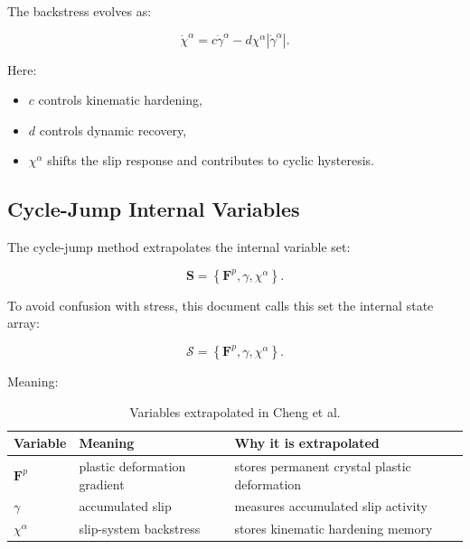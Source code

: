 \documentclass[11pt,a4paper]{article}
\begin{document}
The backstress evolves as:

\begin{equation}
\dot{\chi}^{\alpha}
=
 c\dot{\gamma}^{\alpha}
-
 d\chi^{\alpha}
|\dot{\gamma}^{\alpha}| .
\end{equation}

Here:

\begin{itemize}
    \item $c$ controls kinematic hardening,
    \item $d$ controls dynamic recovery,
    \item $\chi^{\alpha}$ shifts the slip response and contributes to cyclic hysteresis.
\end{itemize}

\subsection{Cycle-Jump Internal Variables}

The cycle-jump method extrapolates the internal variable set:

\begin{equation}
\bm{S}
=
\left\{
\bm{F}^p,\gamma,\chi^{\alpha}
\right\}.
\end{equation}

To avoid confusion with stress, this document calls this set the internal state array:

\begin{equation}
\mathcal{S}
=
\left\{
\bm{F}^p,\gamma,\chi^{\alpha}
\right\}.
\end{equation}

Meaning:

\begin{table}[H]
\centering
\caption{Variables extrapolated in Cheng et al.}
\begin{tabular}{lll}
\toprule
Variable & Meaning & Why it is extrapolated \\
\midrule
$\bm{F}^p$ & plastic deformation gradient & stores permanent crystal plastic deformation \\
$\gamma$ & accumulated slip & measures accumulated slip activity \\
$\chi^{\alpha}$ & slip-system backstress & stores kinematic hardening memory \\
\bottomrule
\end{tabular}
\end{table}
\end{document}
